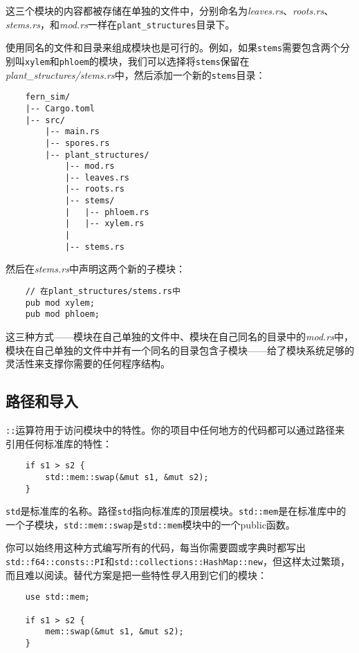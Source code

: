 这三个模块的内容都被存储在单独的文件中，分别命名为\emph{leaves.rs}、\emph{roots.rs}、\emph{stems.rs}，和\emph{mod.rs}一样在\texttt{plant\_structures}目录下。

使用同名的文件和目录来组成模块也是可行的。例如，如果\texttt{stems}需要包含两个分别叫\texttt{xylem}和\texttt{phloem}的模块，我们可以选择将\texttt{stems}保留在\emph{plant\_structures/stems.rs}中，然后添加一个新的\texttt{stems}目录：
\begin{verbatim}
    fern_sim/
    |-- Cargo.toml
    |-- src/
        |-- main.rs
        |-- spores.rs
        |-- plant_structures/
            |-- mod.rs
            |-- leaves.rs
            |-- roots.rs
            |-- stems/
            |   |-- phloem.rs
            |   |-- xylem.rs
            |
            |-- stems.rs
\end{verbatim}

然后在\emph{stems.rs}中声明这两个新的子模块：
\begin{verbatim}
    // 在plant_structures/stems.rs中
    pub mod xylem;
    pub mod phloem;
\end{verbatim}

这三种方式——模块在自己单独的文件中、模块在自己同名的目录中的\emph{mod.rs}中，模块在自己单独的文件中并有一个同名的目录包含子模块——给了模块系统足够的灵活性来支撑你需要的任何程序结构。

\subsection{路径和导入}
\texttt{::}运算符用于访问模块中的特性。你的项目中任何地方的代码都可以通过路径来引用任何标准库的特性：
\begin{verbatim}
    if s1 > s2 {
        std::mem::swap(&mut s1, &mut s2);
    }
\end{verbatim}

\texttt{std}是标准库的名称。路径\texttt{std}指向标准库的顶层模块。\texttt{std::mem}是在标准库中的一个子模块，\texttt{std::mem::swap}是\texttt{std::mem}模块中的一个public函数。

你可以始终用这种方式编写所有的代码，每当你需要圆或字典时都写出\\
\texttt{std::f64::consts::PI}和\texttt{std::collections::HashMap::new}，但这样太过繁琐，而且难以阅读。替代方案是把一些特性\emph{导入}用到它们的模块：
\begin{verbatim}
    use std::mem;

    if s1 > s2 {
        mem::swap(&mut s1, &mut s2);
    }
\end{verbatim}

